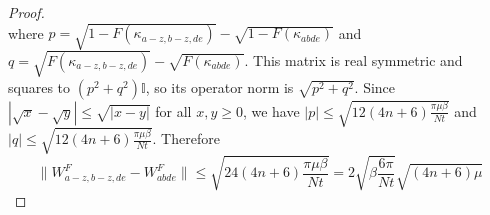 \documentclass[aps,floatfix,10pt,amssymb,amsfont,amsmath,superscriptaddress,float,nofootinbib,longbibliography,nobalancelastpage,twocolumn]{revtex4-2}
\begin{document}
\begin{proof}
\begin{equation}
\end{equation}
where $p=\sqrt{1-F(\kappa_{a-z,b-z,de})}-\sqrt{1-F(\kappa_{abde})}$ and $q=\sqrt{F(\kappa_{a-z,b-z,de})}-\sqrt{F(\kappa_{abde})}$. This matrix is real symmetric and squares to $(p^2+q^2)\mathbb{I}$, so its operator norm is $\sqrt{p^2+q^2}$. Since $|\sqrt{x}-\sqrt{y}|\le\sqrt{|x-y|}$ for all $x,y\ge 0$, we have $|p|\leq \sqrt{12(4n+6)\frac{\pi\mu\beta}{Nt}}$ and $|q|\leq \sqrt{12(4n+6)\frac{\pi\mu\beta}{Nt}}$. Therefore
\begin{equation}
    \|W^F_{a-z,b-z,de}-W^F_{abde}\|\le\sqrt{24(4n+6)\frac{\pi\mu\beta}{Nt}}
    =2\sqrt{\beta\frac{6\pi}{Nt}}\sqrt{(4n+6)\mu}
\end{equation}
\end{proof}
\clearpage
\end{document}
